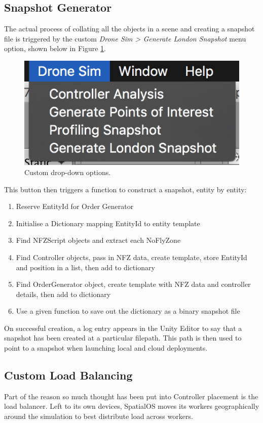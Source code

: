 \documentclass[a4paper,12pt,titlepage]{article}
\begin{document}
\subsection{Snapshot Generator}
The actual process of collating all the objects in a scene and creating a snapshot file is triggered by the custom \textit{Drone Sim > Generate London Snapshot} menu option, shown below in Figure \ref{fig:menuotions}.

\begin{figure}[!hbpt]
  \center
  \includegraphics[width=0.5\linewidth]{img/menuotions.png}
  \caption{Custom drop-down options.}
  \label{fig:menuotions}
\end{figure}

This button then triggers a function to construct a snapshot, entity by entity:
\begin{enumerate}
  \item Reserve EntityId for Order Generator
  \item Initialise a Dictionary mapping EntityId to entity template
  \item Find NFZScript objects and extract each NoFlyZone
  \item Find Controller objects, pass in NFZ data, create template, store EntityId and position in a list, then add to dictionary
  \item Find OrderGenerator object, create template with NFZ data and controller details, then add to dictionary
  \item Use a given function to save out the dictionary as a binary snapshot file
\end{enumerate}

On successful creation, a log entry appears in the Unity Editor to say that a snapshot has been created at a particular filepath. This path is then used to point to a snapshot when launching local and cloud deployments.

\subsection{Custom Load Balancing}
Part of the reason so much thought has been put into Controller placement is the load balancer. Left to its own devices, SpatialOS moves its workers geographically around the simulation to best distribute load across workers.\\
\end{document}
